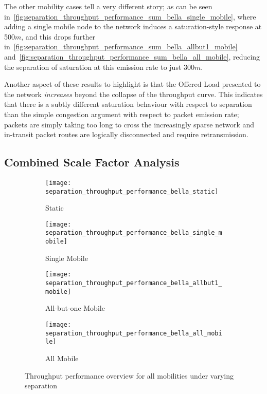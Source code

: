 The other mobility cases tell a very different story; as can be seen in~\autoref{fig:separation_throughput_performance_sum_bella_single_mobile}, where adding a single mobile node to the network induces a saturation-style response at 500$m$, and this drops further in~\autoref{fig:separation_throughput_performance_sum_bella_allbut1_mobile} and~\autoref{fig:separation_throughput_performance_sum_bella_all_mobile}, reducing the separation of saturation at this emission rate to just 300$m$.

Another aspect of these results to highlight is that the Offered Load presented to the network \emph{increases} beyond the collapse of the throughput curve. 
This indicates that there is a subtly different saturation behaviour with respect to separation than the simple congestion argument with respect to packet emission rate; packets are simply taking too long to cross the increasingly sparse network and in-transit packet routes are logically disconnected and require retransmission.



\subsection{Combined Scale Factor Analysis}
\begin{figure}[h]
	\begin{subfigure}[t]{0.5\textwidth}
		\centering
		\texttt{[image: separation\_throughput\_performance\_bella\_static]}
		\caption{Static}
		\label{fig:separation_throughput_performance_sum_bella_static}
	\end{subfigure}
	\begin{subfigure}[t]{0.5\textwidth}
		\centering
		\texttt{[image: separation\_throughput\_performance\_bella\_single\_mobile]}
		\caption{Single Mobile}
		\label{fig:separation_throughput_performance_sum_bella_single_mobile}
	\end{subfigure}
	
	\begin{subfigure}[t]{0.5\textwidth}
		\centering
		\texttt{[image: separation\_throughput\_performance\_bella\_allbut1\_mobile]}
		\caption{All-but-one Mobile}
		\label{fig:separation_throughput_performance_sum_bella_allbut1_mobile}
	\end{subfigure}  
	\begin{subfigure}[t]{0.5\textwidth}
		\centering
		\texttt{[image: separation\_throughput\_performance\_bella\_all\_mobile]}
		\caption{All Mobile}
		\label{fig:separation_throughput_performance_sum_bella_all_mobile}
	\end{subfigure}  
	\caption{Throughput performance overview for all mobilities under varying separation}
	\label{fig:separation_all}
\end{figure}

